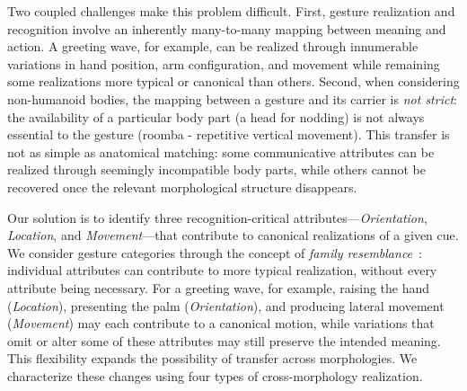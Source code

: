 \documentclass[letterpaper,10pt,conference]{ieeeconf}
\begin{document}
Two coupled challenges make this problem difficult. First, gesture realization and recognition involve an inherently many-to-many mapping between meaning and action. A greeting wave, for example, can be realized through innumerable variations in hand position, arm configuration, and movement while remaining some realizations more typical or canonical than others. Second, when considering non-humanoid bodies, the mapping between a gesture and its carrier is \textit{not strict}: the availability of a particular body part (a head for nodding) is not always essential to the gesture (roomba - repetitive vertical movement). This transfer is not as simple as anatomical matching: some communicative attributes can be realized through seemingly incompatible body parts, while others cannot be recovered once the relevant morphological structure disappears.

Our solution is to identify three recognition-critical attributes---\textit{Orientation}, \textit{Location}, and \textit{Movement}---that contribute to canonical realizations of a given cue. We consider gesture categories through the concept of \textit{family resemblance}~\cite{rosch1975family}: individual attributes can contribute to more typical realization, without every attribute being necessary. For a greeting wave, for example, raising the hand (\textit{Location}), presenting the palm (\textit{Orientation}), and producing lateral movement (\textit{Movement}) may each contribute to a canonical motion, while variations that omit or alter some of these attributes may still preserve the intended meaning. This flexibility expands the possibility of transfer across morphologies. We characterize these changes using four types of cross-morphology realization.
\end{document}
